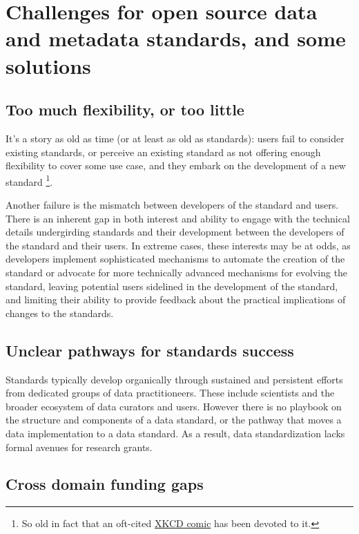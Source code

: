 \documentclass[
  letterpaper,
  DIV=11,
  numbers=noendperiod]{scrartcl}
\begin{document}
\section{Challenges for open source data and metadata standards, and
some
solutions}\label{challenges-for-open-source-data-and-metadata-standards-and-some-solutions}

\subsection{Too much flexibility, or too
little}\label{too-much-flexibility-or-too-little}

It's a story as old as time (or at least as old as standards): users
fail to consider existing standards, or perceive an existing standard as
not offering enough flexibility to cover some use case, and they embark
on the development of a new standard \footnote{So old in fact that an
  oft-cited \href{https://xkcd.com/927/}{XKCD comic} has been devoted to
  it.}.

Another failure is the mismatch between developers of the standard and
users. There is an inherent gap in both interest and ability to engage
with the technical details undergirding standards and their development
between the developers of the standard and their users. In extreme
cases, these interests may be at odds, as developers implement
sophisticated mechanisms to automate the creation of the standard or
advocate for more technically advanced mechanisms for evolving the
standard, leaving potential users sidelined in the development of the
standard, and limiting their ability to provide feedback about the
practical implications of changes to the standards.

\subsection{Unclear pathways for standards
success}\label{unclear-pathways-for-standards-success}

Standards typically develop organically through sustained and persistent
efforts from dedicated groups of data practitioneers. These include
scientists and the broader ecosystem of data curators and users. However
there is no playbook on the structure and components of a data standard,
or the pathway that moves a data implementation to a data standard. As a
result, data standardization lacks formal avenues for research grants.

\subsection{Cross domain funding gaps}\label{cross-domain-funding-gaps}
\end{document}
